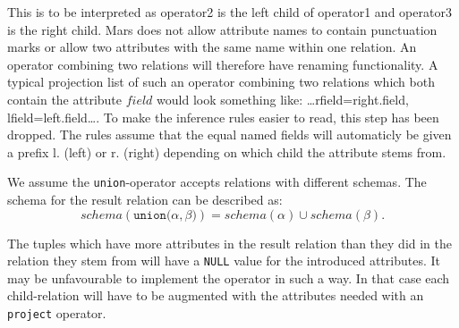 This is to be interpreted as \textsf{operator2} is the left child of \textsf{operator1} and \textsf{operator3} is
the right child. Mars does not allow attribute names to contain punctuation marks or allow two attributes with the
same name within one relation. An operator combining two relations will therefore have renaming functionality. A
typical projection list of such an operator combining two relations which both contain the attribute $field$ would
look something like: \textsf{\ldots rfield=right.field, lfield=left.field\ldots}. To make the inference rules
easier to read, this step has been dropped. The rules assume that the equal named fields will automaticly be given
a prefix \textsf{l.} (left) or \textsf{r.} (right) depending on which child the attribute stems from.

We assume the \texttt{union}-operator accepts relations with different schemas. The schema for the result
relation can be described as:
\begin{equation*}
schema(\texttt{union(}\alpha, \beta\texttt{)}) = schema(\alpha) \cup schema(\beta).
\end{equation*}

The tuples which have more attributes in the result relation than they did in the relation they stem from will
have a \texttt{NULL} value for the introduced attributes. It may be unfavourable to implement the operator in such
a way. In that case each child-relation will have to be augmented with the attributes needed with an
\texttt{project} operator.
